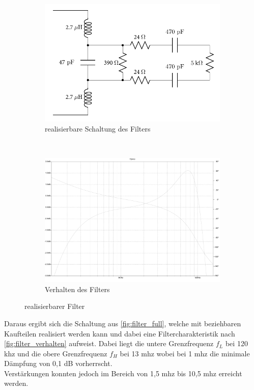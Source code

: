 \begin{figure}[!h]
        \centering
        \begin{subfigure}[b]{0.48\textwidth}
                \includegraphics[width=\textwidth]{images/Bandpass/full}
	    		\caption{realisierbare Schaltung des Filters}
	    		\label{fig:filter_full}
        \end{subfigure}%
        ~ %
        \begin{subfigure}[b]{0.48\textwidth}
        	\includegraphics[width=\textwidth]{images/Bandpass/Bandpass}
		    \caption{Verhalten des Filters}
		    \label{fig:filter_verhalten}
        \end{subfigure}
        \caption{realisierbarer Filter}\label{fig:filter_final}
\end{figure}
Daraus ergibt sich die Schaltung aus \autoref{fig:filter_full}, welche mit beziehbaren Kaufteilen realisiert werden kann und dabei eine Filtercharakteristik nach \autoref{fig:filter_verhalten} aufweist. Dabei liegt die untere Grenzfrequenz $f_L$ bei 120 \ac{khz} und die obere Grenzfrequenz $f_H$ bei 13 \ac{mhz} wobei bei 1 \ac{mhz} die minimale Dämpfung von 0,1 dB vorherrscht.\\
Verstärkungen konnten jedoch im Bereich von 1,5 \ac{mhz} bis 10,5 \ac{mhz} erreicht werden.
